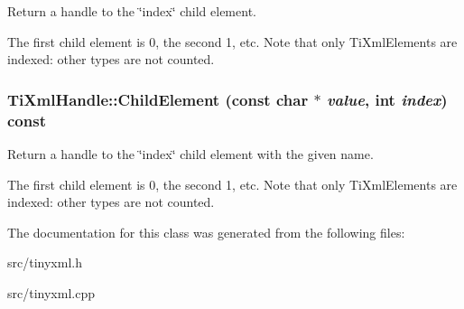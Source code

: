 Return a handle to the \char`\"{}index\char`\"{} child element. 

The first child element is 0, the second 1, etc. Note that only Ti\-Xml\-Elements are indexed: other types are not counted.
\subsubsection{ Ti\-Xml\-Handle::Child\-Element (const char $\ast$ {\em value}, int {\em index}) const}\label{classTiXmlHandle_TiXmlHandlea9}


Return a handle to the \char`\"{}index\char`\"{} child element with the given name. 

The first child element is 0, the second 1, etc. Note that only Ti\-Xml\-Elements are indexed: other types are not counted.

The documentation for this class was generated from the following files:\begin{CompactItemize}
\item 
src/tinyxml.h\item 
src/tinyxml.cpp\end{CompactItemize}
